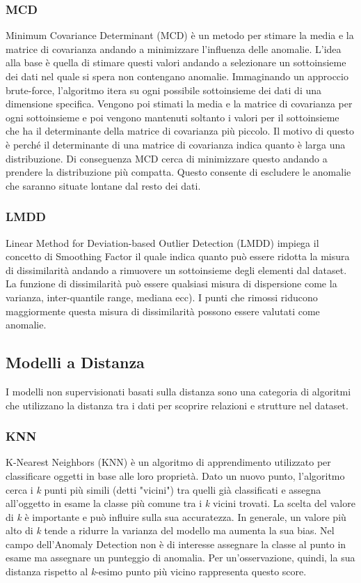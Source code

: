 \subsubsection{MCD}
Minimum Covariance Determinant (MCD) \cite{rousseeuw1999fast, hardin2004outlier} è un metodo per stimare la media e la matrice di covarianza andando a minimizzare l'influenza delle anomalie. L'idea alla base è quella di stimare questi valori andando a selezionare un sottoinsieme dei dati nel quale si spera non contengano anomalie.
Immaginando un approccio brute-force, l'algoritmo itera su ogni possibile sottoinsieme dei dati di una dimensione specifica. Vengono poi stimati la media e la matrice di covarianza per ogni sottoinsieme e poi vengono mantenuti soltanto i valori per il sottoinsieme che ha il determinante della matrice di covarianza più piccolo. Il motivo di questo è perché il determinante di una matrice di covarianza indica quanto è larga una distribuzione. Di conseguenza MCD cerca di minimizzare questo andando a prendere la distribuzione più compatta. Questo consente di escludere le anomalie che saranno situate lontane dal resto dei dati.

\subsubsection{LMDD}
Linear Method for Deviation-based Outlier Detection (LMDD) \cite{arning1996linear} impiega il concetto di Smoothing Factor il quale indica quanto può essere ridotta la misura di dissimilarità andando a rimuovere un sottoinsieme degli elementi dal dataset. La funzione di dissimilarità può essere qualsiasi misura di dispersione come la varianza, inter-quantile range, mediana ecc).
I punti che rimossi riducono maggiormente questa misura di dissimilarità possono essere valutati come anomalie.

\subsection{Modelli a Distanza}
I modelli non supervisionati basati sulla distanza sono una categoria di algoritmi che utilizzano la distanza tra i dati per scoprire relazioni e strutture nel dataset.

\subsubsection{KNN}
K-Nearest Neighbors (KNN) \cite{ramaswamy2000efficient,angiulli2002fast} è un algoritmo di apprendimento utilizzato per classificare oggetti in base alle loro proprietà. Dato un nuovo punto, l'algoritmo cerca i \textit{k} punti più simili (detti "vicini") tra quelli già classificati e assegna all'oggetto in esame la classe più comune tra i \textit{k} vicini trovati. La scelta del valore di \textit{k} è importante e può influire sulla sua accuratezza. In generale, un valore più alto di \textit{k} tende a ridurre la varianza del modello ma aumenta la sua bias.
Nel campo dell'Anomaly Detection non è di interesse assegnare la classe al punto in esame ma assegnare un punteggio di anomalia. Per un'osservazione, quindi, la sua distanza rispetto al \textit{k}-esimo punto più vicino rappresenta questo score.

